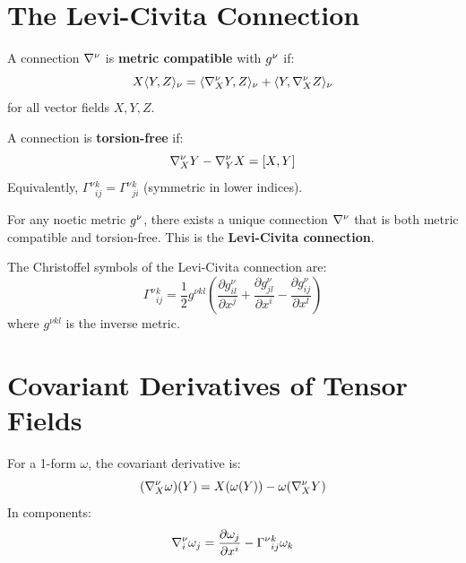 \section{The Levi-Civita Connection}

\begin{definition}
\label{def:metric-compatible}
A connection $\nabla^\nu$ is \textbf{metric compatible} with $g^\nu$ if:
\[
    X\langle Y, Z \rangle_\nu = \langle \nabla^\nu_X Y, Z \rangle_\nu
    + \langle Y, \nabla^\nu_X Z \rangle_\nu
\]
for all vector fields $X, Y, Z$.
\end{definition}

\begin{definition}
\label{def:torsion-free}
A connection is \textbf{torsion-free} if:
\[
    \nabla^\nu_X Y - \nabla^\nu_Y X = [X, Y]
\]
Equivalently, $\Gamma^\nu{}^k_{ij} = \Gamma^\nu{}^k_{ji}$ (symmetric in lower indices).
\end{definition}

\begin{theorem}
\label{thm:levi-civita}
For any noetic metric $g^\nu$, there exists a unique connection
$\nabla^\nu$ that is both metric compatible and torsion-free.
This is the \textbf{Levi-Civita connection}.
\end{theorem}

\begin{proposition}
\label{prop:christoffel-formula}
The Christoffel symbols of the Levi-Civita connection are:
\[
    \Gamma^\nu{}^k_{ij} = \frac{1}{2} g^{\nu kl}\left(
    \frac{\partial g^\nu_{il}}{\partial x^j}
    + \frac{\partial g^\nu_{jl}}{\partial x^i}
    - \frac{\partial g^\nu_{ij}}{\partial x^l}
    \right)
\]
where $g^{\nu kl}$ is the inverse metric.
\end{proposition}

\section{Covariant Derivatives of Tensor Fields}

\begin{definition}
\label{def:cov-deriv-forms}
For a 1-form $\omega$, the covariant derivative is:
\[
    (\nabla^\nu_X \omega)(Y) = X(\omega(Y)) - \omega(\nabla^\nu_X Y)
\]
In components:
\[
    \nabla^\nu_i \omega_j = \frac{\partial \omega_j}{\partial x^i}
    - \Gamma^\nu{}^k_{ij} \omega_k
\]
\end{definition}

